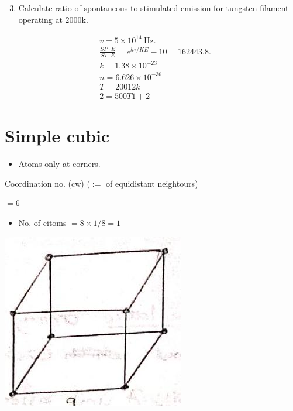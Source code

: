 \documentclass[10pt]{article}
\begin{document}
\begin{enumerate}
  \setcounter{enumi}{2}
  \item Calculate ratio of spontaneous to stimulated emission for tungsten filament operating at $2000 \mathrm{k}$.
\end{enumerate}

$$
\begin{aligned}
& v=5 \times 10^{14} \mathrm{~Hz} . \\
& \frac{S P \cdot E}{S 7 \cdot E}=e^{h \tau / K E}-10=162443.8 . \\
& k=1.38 \times 10^{-23} \\
& n=6.626 \times 10^{-36} \\
& T=20012 k \\
& 2=500 T 1+2
\end{aligned}
$$

\section*{Simple cubic}
\begin{itemize}
  \item Atoms only at corners.
\end{itemize}

Coordination no. (cw) $(:=$ of equidistant neightours)

$=6$

\begin{itemize}
  \item No. of citoms $=8 \times 1 / 8=1$
\end{itemize}

\begin{center}
\includegraphics[max width=\textwidth]{2024_06_16_30d750483617f1939202g-07}
\end{center}
\end{document}
